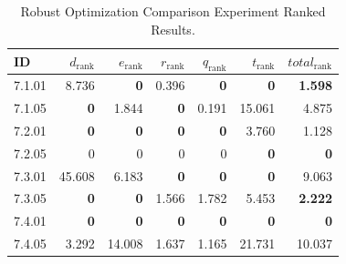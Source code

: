 \begin{table}[ht]
\centering
\footnotesize
\caption{Robust Optimization Comparison Experiment Ranked Results.}
\label{tab:robust_comparison_ranked}
\begin{tabular}{@{}lrrrrrr@{}}
\hline
    \textbf{ID} & \textbf{$d_{\text{rank}}$} & \textbf{$e_{\text{rank}}$} & \textbf{$r_{\text{rank}}$} & \textbf{$q_{\text{rank}}$} & \textbf{$t_{\text{rank}}$} & \textbf{$total_{\text{rank}}$} \\
\hline
    7.1.01 & 8.736 & \textbf{0} & 0.396 & \textbf{0} & \textbf{0} & \textbf{1.598} \\
    7.1.05 & \textbf{0} & 1.844 & \textbf{0} & 0.191 & 15.061 & 4.875 \\
    \noalign{\smallskip}
    7.2.01 & \textbf{0} & \textbf{0} & \textbf{0} & \textbf{0} & 3.760 & 1.128 \\
    7.2.05 & 0 & 0 & 0 & 0 & \textbf{0} & \textbf{0} \\
    \noalign{\smallskip}
    7.3.01 & 45.608 & 6.183 & \textbf{0} & \textbf{0} & \textbf{0} & 9.063 \\
    7.3.05 & \textbf{0} & \textbf{0} & 1.566 & 1.782 & 5.453 & \textbf{2.222} \\
    \noalign{\smallskip}
    7.4.01 & \textbf{0} & \textbf{0} & \textbf{0} & \textbf{0} & \textbf{0} & \textbf{0} \\
    7.4.05 & 3.292 & 14.008 & 1.637 & 1.165 & 21.731 & 10.037 \\
\hline
\end{tabular}
\end{table}